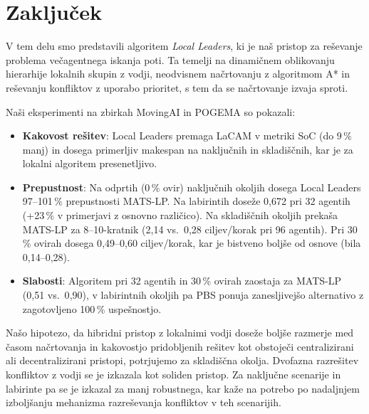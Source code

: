 \documentclass[sigconf,nonacm]{acmart}
\begin{document}
\section{Zaključek}

V tem delu smo predstavili algoritem \textit{Local Leaders}, ki je naš pristop za 
reševanje problema večagentnega iskanja poti. Ta temelji na dinamičnem oblikovanju 
hierarhije lokalnih skupin z vodji, neodvisnem načrtovanju z algoritmom A* in reševanju 
konfliktov z uporabo prioritet, s tem da se načrtovanje izvaja sproti.

Naši eksperimenti na zbirkah MovingAI in POGEMA so pokazali:

\begin{itemize}
    \item \textbf{Kakovost rešitev}: Local Leaders premaga LaCAM v metriki SoC
    (do $9\,\%$ manj) in dosega primerljiv makespan na naključnih in skladiščnih,
    kar je za lokalni algoritem presenetljivo.
    
    \item \textbf{Prepustnost}: Na odprtih (0\,\% ovir) naključnih okoljih dosega
    Local Leaders 97--101\,\% prepustnosti MATS-LP. Na labirintih doseže 0{,}672
    pri 32 agentih (+23\,\% v primerjavi z osnovno različico). Na skladiščnih okoljih
    prekaša MATS-LP za 8--10-kratnik (2{,}14 vs.\ 0{,}28 ciljev/korak pri 96
    agentih). Pri 30\,\% ovirah dosega 0{,}49--0{,}60 ciljev/korak, kar je
    bistveno boljše od osnove (bila 0{,}14--0{,}28).

    \item \textbf{Slabosti}: Algoritem pri 32 agentih in 30\,\% ovirah zaostaja za
    MATS-LP (0{,}51 vs.\ 0{,}90), v labirintnih okoljih pa PBS ponuja zanesljivejšo
    alternativo z zagotovljeno 100\,\% uspešnostjo.
\end{itemize}

Našo hipotezo, da hibridni pristop z lokalnimi vodji doseže boljše razmerje med časom načrtovanja in
kakovostjo pridobljenih rešitev kot obstoječi centralizirani ali decentralizirani pristopi,
potrjujemo za skladiščna okolja. Dvofazna razrešitev konfliktov z
vodji se je izkazala kot soliden pristop. Za naključne scenarije in labirinte pa se je izkazal za
manj robustnega, kar kaže na potrebo po nadaljnjem izboljšanju mehanizma razreševanja konfliktov v teh scenarijih.



\end{document}
